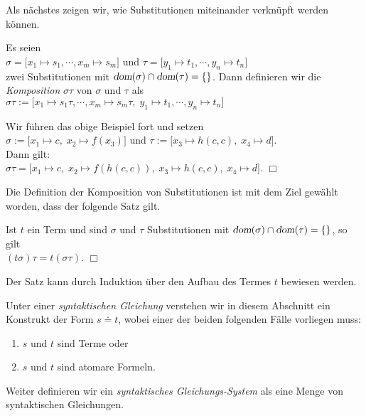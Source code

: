 \noindent
Als n\"{a}chstes zeigen wir, wie  Substitutionen miteinander verkn\"{u}pft werden k\"{o}nnen.
\begin{Definition} 
    Es seien\\[0.2cm]
    \hspace*{1.3cm}  $\sigma = \big[ x_1 \mapsto s_1, \cdots, x_m \mapsto s_m \big]$ \quad und \quad  $\tau = \big[ y_1 \mapsto t_1, \cdots, y_n \mapsto t_n \big]$ \\[0.2cm]
    zwei Substitutionen mit $\textsl{dom}(\sigma) \cap \textsl{dom}(\tau) = \{\}$. Dann definieren
    wir die \emph{Komposition} $\sigma\tau$ von $\sigma$ und $\tau$ als \\[0.2cm]
    \hspace*{1.3cm} $\sigma\tau := \big[ x_1 \mapsto s_1\tau, \cdots, x_m \mapsto s_m\tau,\; y_1 \mapsto t_1, \cdots, y_n \mapsto t_n \big]$
    \eox
\end{Definition}

\example
Wir f\"{u}hren das obige Beispiel fort und setzen \\[0.2cm]
\hspace*{1.3cm} $\sigma := \big[ x_1 \mapsto c,\; x_2 \mapsto f(x_3) \big]$
                \quad und \quad $\tau := \big[ x_3 \mapsto h(c,c),\; x_4 \mapsto d \big]$. \\[0.2cm]
Dann gilt: \\[0.2cm]
\hspace*{1.3cm} $ \sigma\tau = \big[ x_1 \mapsto c,\; x_2 \mapsto f(h(c,c)),\; x_3 \mapsto h(c,c),\;x_4 \mapsto d \big]$.
\hspace*{\fill} $\Box$
\vspace{0.3cm}

\noindent
Die Definition der Komposition von Substitutionen ist mit dem Ziel gew\"{a}hlt worden, dass
der folgende Satz gilt.
\begin{Satz} \label{satz:komposition}
    Ist $t$ ein Term und sind $\sigma$ und $\tau$ Substitutionen mit 
    $\textsl{dom}(\sigma) \cap \textsl{dom}(\tau) = \{\}$, so gilt \\[0.2cm]
    \hspace*{1.3cm} $(t \sigma)\tau = t (\sigma\tau)$.
    \hspace*{\fill} $\Box$
\end{Satz}
Der Satz kann durch Induktion \"{u}ber den Aufbau des Termes $t$ bewiesen werden.


\begin{Definition}
Unter einer \emph{syntaktischen Gleichung} verstehen wir in diesem Abschnitt ein Konstrukt der Form
$s \doteq t$, wobei einer der beiden folgenden F\"{a}lle vorliegen muss:
\begin{enumerate}
\item $s$ und $t$ sind Terme  oder
\item $s$ und $t$ sind atomare Formeln.
\end{enumerate}
Weiter definieren wir ein \emph{syntaktisches Gleichungs-System} als eine Menge
von syntaktischen Gleichungen.
\eox
\end{Definition}


